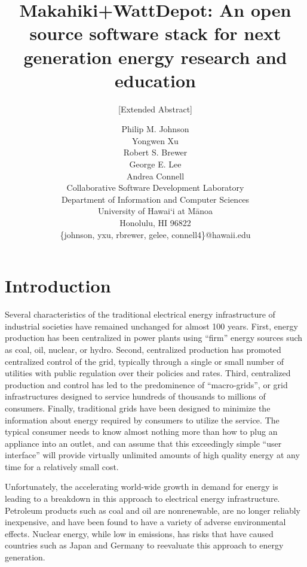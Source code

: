 \documentclass{acm_proc_article-sp}
\begin{document}
\title{Makahiki+WattDepot: An open source software stack for 
next generation energy research and education}
\subtitle{[Extended Abstract]}

\author{Philip M. Johnson\\
        Yongwen Xu\\
        Robert S. Brewer\\
        George E. Lee\\
        Andrea Connell\\
        Collaborative Software Development Laboratory\\
        Department of Information and Computer Sciences\\
        University of Hawai`i at M\=anoa\\
        Honolulu, HI 96822\\
        \{johnson, yxu, rbrewer, gelee, connell4\}@hawaii.edu\\
}


\maketitle

\section{Introduction}

Several characteristics of the traditional electrical energy infrastructure
of industrial societies have remained unchanged for almost 100 years.  First, energy
production has been centralized in power plants using ``firm'' energy sources such as coal, oil,
nuclear, or hydro.  Second, centralized production
has promoted centralized control of the grid, typically through a single or small number of
utilities with public regulation over their policies and rates.  Third, centralized
production and control has led to the predominence of ``macro-grids'', or grid
infrastructures designed to service hundreds of thousands to millions of
consumers. Finally, traditional grids have been designed to minimize the information about
energy required by consumers to utilize the service.  The typical consumer needs to know
almost nothing more than how to plug an appliance into an outlet, and can
assume that this exceedingly simple ``user interface'' will provide virtually unlimited
amounts of high quality energy at any time for a relatively small cost.

Unfortunately, the accelerating world-wide growth in demand for energy is
leading to a breakdown in this approach to electrical energy infrastructure.  Petroleum
products such as coal and oil are nonrenewable, are no longer reliably inexpensive, and
have been found to have a variety of adverse environmental effects.  Nuclear energy, while
low in emissions, has risks that have caused countries such as Japan and Germany to
reevaluate this approach to energy generation.  
\end{document}
